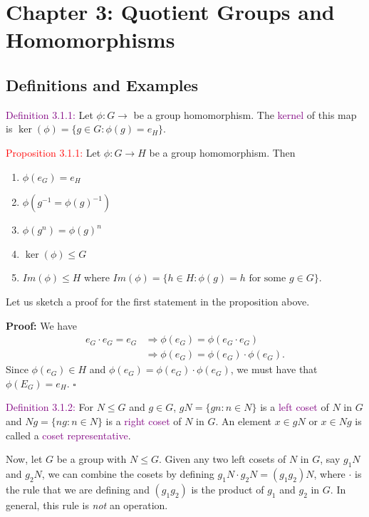 \documentclass{article}
\begin{document}
\newpage
\section{Chapter 3: Quotient Groups and Homomorphisms}
\subsection{Definitions and Examples}

\textcolor{purple}{Definition 3.1.1:} Let $\phi:G \longrightarrow$ be a group homomorphism. The \textcolor{purple}{kernel} of this map is 
$\ker{(\phi)} = \{g \in G: \phi(g) = e_H\}$.

\textcolor{red}{Proposition 3.1.1:} Let $\phi:G \longrightarrow H$ be a group homomorphism. Then
\begin{enumerate}
    \item $\phi(e_G) = e_H$
    \item $\phi(g^{-1} = \phi(g)^{-1})$
    \item $\phi(g^n) = \phi(g)^n$
    \item $\ker{(\phi)} \leq G$
    \item $Im{(\phi)} \leq H$ where $Im{(\phi)} = \{h \in H: \phi(g) = h \text{ for some } g \in G\}$.
\end{enumerate}

Let us sketch a proof for the first statement in the proposition above.

\textbf{Proof:} We have
\begin{align*}
    e_G \cdot e_G = e_G &\Longrightarrow \phi(e_G) = \phi(e_G \cdot e_G) \\
    &\Longrightarrow \phi(e_G) = \phi(e_G) \cdot \phi(e_G).
\end{align*}
Since $\phi(e_G) \in H$ and $\phi(e_G) = \phi(e_G) \cdot \phi(e_G)$, we must have that $\phi(E_G) = e_H$. $\square$

\textcolor{purple}{Definition 3.1.2:} For $N \leq G$ and $g \in G$, $gN = \{gn: n \in N\}$ is a \textcolor{purple}{left coset} of $N$ in 
$G$ and $Ng = \{ng: n \in N\}$ is a \textcolor{purple}{right coset} of $N$ in $G$. An element $x \in gN$ or $x \in Ng$ is called a 
\textcolor{purple}{coset representative}.

Now, let $G$ be a group with $N \leq G$. Given any two left cosets of $N$ in $G$, say $g_1N$ and $g_2N$, we can combine the cosets by 
defining $g_1N \cdot g_2N = (g_1g_2)N$, where $\cdot$ is the rule that we are defining and $(g_1g_2)$ is the product of $g_1$ and $g_2$ 
in $G$. In general, this rule is \textit{not} an operation.
\end{document}

